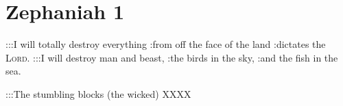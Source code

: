 \section{Zephaniah 1}\label{Zephaniah 1}
\begin{enumerate}
     :::I will totally destroy everything :from off the face of the land :dictates the \textsc{Lord}.%
     :::I will destroy man and beast, :the birds in the sky, :and the fish in the sea.%
    
    :::The stumbling blocks (the wicked) XXXX%
\end{enumerate}
